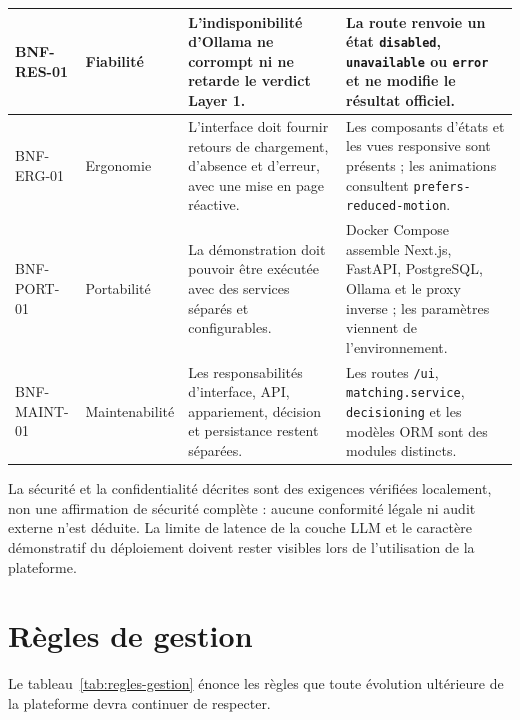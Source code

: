 {\begin{longtable}{|>{\raggedright\arraybackslash\scriptsize}p{2.15cm}|>{\raggedright\arraybackslash}p{2.15cm}|>{\raggedright\arraybackslash}p{5.3cm}|>{\raggedright\arraybackslash}p{3.65cm}|}
\hline
BNF-RES-01 & Fiabilité & L'indisponibilité d'Ollama ne corrompt ni ne retarde le verdict Layer 1. & La route renvoie un état \texttt{disabled}, \texttt{unavailable} ou \texttt{error} et ne modifie le résultat officiel.\\
\hline
BNF-ERG-01 & Ergonomie & L'interface doit fournir retours de chargement, d'absence et d'erreur, avec une mise en page réactive. & Les composants d'états et les vues responsive sont présents ; les animations consultent \texttt{prefers-reduced-motion}.\\
\hline
BNF-PORT-01 & Portabilité & La démonstration doit pouvoir être exécutée avec des services séparés et configurables. & Docker Compose assemble Next.js, FastAPI, PostgreSQL, Ollama et le proxy inverse ; les paramètres viennent de l'environnement.\\
\hline
BNF-MAINT-01 & Maintenabilité & Les responsabilités d'interface, API, appariement, décision et persistance restent séparées. & Les routes \texttt{/ui}, \texttt{matching.service}, \texttt{decisioning} et les modèles ORM sont des modules distincts.\\
\hline
\end{longtable}\par}
\normalsize


La sécurité et la confidentialité décrites sont des exigences vérifiées localement, non une affirmation de sécurité complète : aucune conformité légale ni audit externe n'est déduite. La limite de latence de la couche LLM et le caractère démonstratif du déploiement doivent rester visibles lors de l'utilisation de la plateforme.

\section{Règles de gestion}
Le tableau~\ref{tab:regles-gestion} énonce les règles que toute évolution ultérieure de la plateforme devra continuer de respecter.

